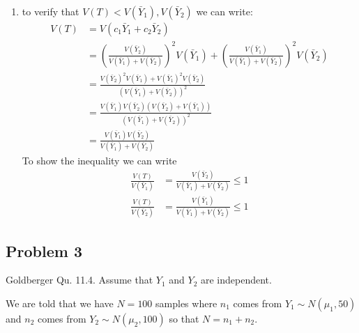 \documentclass{article}
\newcommand{\1}{\mathbf{1}}
\begin{document}
\begin{enumerate}
     \item to verify that $V(T) < V(\bar Y_1), V(\bar Y_2)$ we can write: 
     \begin{align*}
        V(T) &=  V(c_1\bar Y_1 + c_2 \bar Y_2) \\
        &= \left(\frac{V(\bar Y_2)}{V(\bar Y_1) + V(\bar Y_2)}\right)^2 V(\bar Y_1)  +  \left(\frac{V(\bar Y_1)}{V(\bar Y_1) + V(\bar Y_2)} \right)^2 V(\bar Y_2) \\
        &= \frac{V(\bar Y_2)^2 V(\bar Y_1) + V(\bar Y_1)^2V(\bar Y_2)}{\left(V(\bar Y_1) + V(\bar Y_2)\right)^2} \\
        &= \frac{V(\bar Y_1)V(\bar Y_2)\left(V(\bar Y_2) + V(\bar Y_1)\right)}{\left(V(\bar Y_1) + V(\bar Y_2)\right)^2} \\
        &= \frac{V(\bar Y_1)V(\bar Y_2)}{V(\bar Y_1) + V(\bar Y_2)} 
    \end{align*}
    To show the inequality we can write
    \begin{align*}
        \frac{V(T)}{V(\bar Y_1)} &= \frac{V(\bar Y_2)}{V(\bar Y_1) + V(\bar Y_2)} \leq 1 \\
        \frac{V(T)}{V(\bar Y_2)} &= \frac{V(\bar Y_1)}{V(\bar Y_1) + V(\bar Y_2)} \leq 1 
    \end{align*}
 \end{enumerate}
 


\newpage
\subsection*{Problem 3}
Goldberger Qu. 11.4. Assume that $Y_1$ and $Y_2$ are independent.

We are told that we have $N=100$ samples where $n_1$ comes from $Y_1\sim N(\mu_1, 50)$ and $n_2$ comes from $Y_2\sim N(\mu_2, 100)$ so that $N=n_1+n_2$. 
\end{document}
